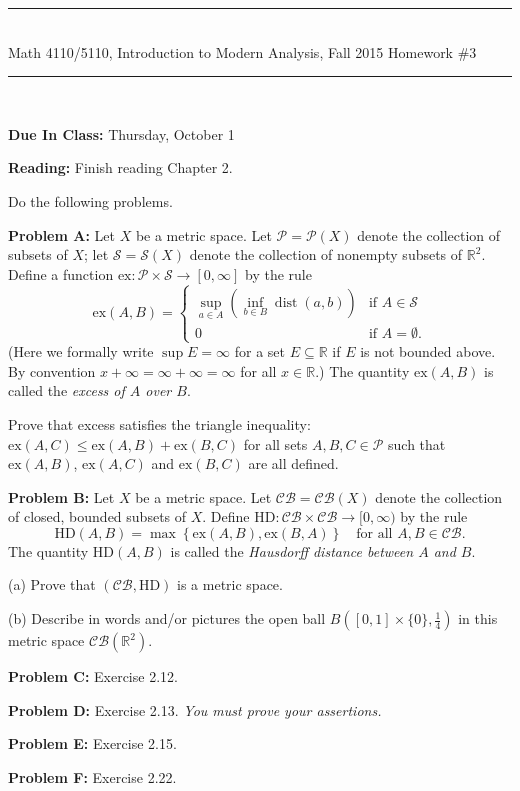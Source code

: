 \documentclass[11pt,reqno]{amsart}
\newcommand{\RR}{\mathbb{R}}
\newcommand{\spacer}{\vspace{.4cm}}
\newcommand{\dist}{\mathop\mathrm{dist}\nolimits}
\begin{document}
\begin{center}
\hrule \ \\
\large \textsf{Math 4110/5110, Introduction to Modern Analysis, Fall 2015} \hfill
\Large Homework \#3 \vspace{.25cm} \hrule \
\end{center}

\spacer

\textbf{Due In Class:} Thursday, October 1  \spacer

\textbf{Reading:} Finish reading Chapter 2.  \spacer

Do the following problems. \spacer

\textbf{Problem A:} Let $X$ be a metric space. Let $\mathcal{P}=\mathcal{P}(X)$ denote the collection of subsets of $X$; let $\mathcal{S}=\mathcal{S}(X)$ denote the collection of nonempty subsets of $\RR^2$. Define a function $\mathrm{ex}:\mathcal{P}\times \mathcal{S}\rightarrow[0,\infty]$ by the rule $$\mathrm{ex}(A,B) = \left\{\begin{array}{ll} \sup_{a\in A}\left(\inf_{b\in B}\dist(a,b)\right) &\text{if }A\in \mathcal{S} \\ 0 &\text{if }A=\emptyset.\end{array}\right.$$ (Here we formally write $\sup E = \infty$ for a set $E\subseteq\RR$ if $E$ is not bounded above. By convention $x+\infty=\infty+\infty=\infty$ for all $x\in\RR$.) The quantity $\mathrm{ex}(A,B)$ is called the \emph{excess of $A$ over $B$}.

\quad Prove that excess satisfies the triangle inequality: $\mathrm{ex}(A,C) \leq \mathrm{ex}(A,B)+\mathrm{ex}(B,C)$ for all sets $A,B,C\in\mathcal{P}$ such that $\mathrm{ex}(A,B)$, $\mathrm{ex}(A,C)$ and $\mathrm{ex}(B,C)$ are all defined. \spacer

\textbf{Problem B:} Let $X$ be a metric space. Let $\mathcal{CB}=\mathcal{CB}(X)$ denote the collection of closed, bounded subsets of $X$. Define $\mathrm{HD}:\mathcal{CB}\times\mathcal{CB}\rightarrow [0,\infty)$ by the rule $$\mathrm{HD}(A,B)=\max\left\{\mathrm{ex}(A,B),\mathrm{ex}(B,A)\right\}\quad\text{for all }A,B\in\mathcal{CB}.$$ The quantity $\mathrm{HD}(A,B)$ is called the \emph{Hausdorff distance between $A$ and $B$}.

\quad (a) Prove that $(\mathcal{CB},\mathrm{HD})$ is a metric space.

\quad  (b) Describe in words and/or pictures the open ball $B([0,1]\times\{0\},\frac{1}{4})$ in this metric space $\mathcal{CB}(\RR^2)$.  \spacer

\textbf{Problem C:} Exercise 2.12. \spacer

\textbf{Problem D:} Exercise 2.13. \emph{You must prove your assertions.} \spacer

\textbf{Problem E:} Exercise 2.15. \spacer

\textbf{Problem F:} Exercise 2.22.
\end{document}
